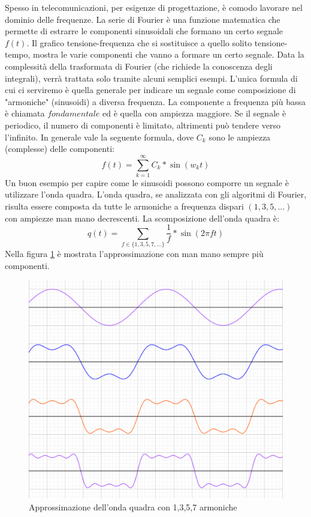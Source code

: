 \documentclass[11pt,a4paper]{article}
\begin{document}
Spesso in telecomunicazioni, per esigenze di progettazione, è comodo lavorare nel dominio delle frequenze. La serie di Fourier è una funzione matematica che permette di estrarre le componenti sinusoidali che formano un certo segnale $f(t)$. Il grafico tensione-frequenza che si sostituisce a quello solito tensione-tempo, mostra le varie componenti che vanno a formare un certo segnale. Data la complessità della trasformata di Fourier (che richiede la conoscenza degli integrali), verrà trattata solo tramite alcuni semplici esempi.
L'unica formula di cui ci serviremo è quella generale per indicare un segnale come composizione di "armoniche" (sinusoidi) a diversa frequenza. La componente a frequenza più bassa è chiamata $fondamentale$ ed è quella con ampiezza maggiore. Se il segnale è periodico, il numero di componenti è limitato, altrimenti può tendere verso l'infinito. In generale vale la seguente formula, dove $C_k$ sono le ampiezza (complesse) delle componenti: 
$$
f(t) = \sum_{k=1}^{\infty} C_k * \sin(w_k t)
$$
Un buon esempio per capire come le sinusoidi possono comporre un segnale è utilizzare l'onda quadra. L'onda quadra, se analizzata con gli algoritmi di Fourier, risulta essere composta da tutte le armoniche a frequenza dispari $(1,3,5,...)$ con ampiezze man mano decrescenti. La scomposizione dell'onda quadra è:
$$
q(t) = \sum_{f \in \{1,3,5,7,...\}} \frac{1}{f} * \sin(2 \pi f t)
$$
Nella figura \ref{fig:fourier} è mostrata l'approssimazione con man mano sempre più componenti.

\begin{figure}
  \includegraphics[width=\linewidth]{images/oq.png}
  \caption{Approssimazione dell'onda quadra con 1,3,5,7 armoniche}
  \label{fig:fourier}
\end{figure}
\end{document}
